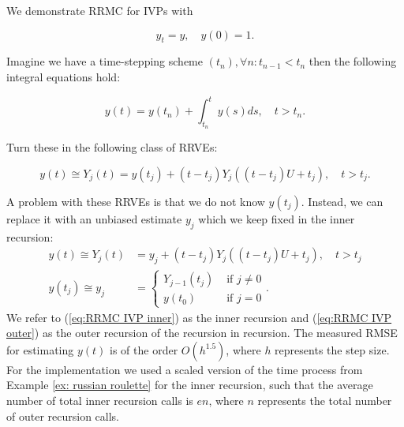 \documentclass[a4paper,12pt]{article}
\begin{document}
\begin{example}[RRMC $y_t=y$] \label{ex:RRMC IVP}
  We demonstrate RRMC for IVPs with

  \begin{equation}
    y_t = y, \quad y(0) = 1.
  \end{equation}

  Imagine we have a time-stepping scheme $(t_{n}), \forall n: t_{n-1} < t_{n}$
  then the following integral equations hold:

  \begin{equation}
    y(t)= y(t_{n}) + \int_{t_{n}}^{t}y(s)ds , \quad t>t_{n}.
  \end{equation}

  Turn these in the following class of RRVEs:

  \begin{equation}
    y(t) \cong Y_{j}(t) = y(t_{j}) + (t-t_{j})Y_{j}((t-t_{j})U+t_{j}), \quad t>t_{j}.
  \end{equation}

  A problem with these RRVEs is that we do not know $y(t_{j})$.
  Instead, we can replace it with an unbiased estimate $y_{j}$
  which we keep fixed in the inner recursion:
  \begin{align}
    \label{eq:RRMC IVP inner}
    y(t) \cong Y_{j}(t)  & = y_{j} + (t-t_{j})Y_{j}((t-t_{j})U+t_{j}), \quad t>t_{j} \\
    y(t_{j}) \cong y_{j} & = \begin{cases}
                               Y_{j-1}(t_{j}) & \text{ if } j \neq 0 \\
                               y(t_{0})       & \text{ if } j = 0
                             \end{cases}.
    \label{eq:RRMC IVP outer}
  \end{align}
  We refer to (\ref{eq:RRMC IVP inner}) as the inner recursion and
  (\ref{eq:RRMC IVP outer}) as the outer recursion of the recursion in
  recursion.
  The measured RMSE for estimating $y(t)$ is of the order
  $O\left(h^{1.5} \right)$, where $h$ represents
  the step size. For the implementation we used a scaled version
  of the time process from Example \ref{ex: russian roulette}
  for the inner recursion, such that the average number of total inner recursion calls
  is $e n$, where $n$ represents the total number of outer recursion calls.
\end{example}

\end{document}

